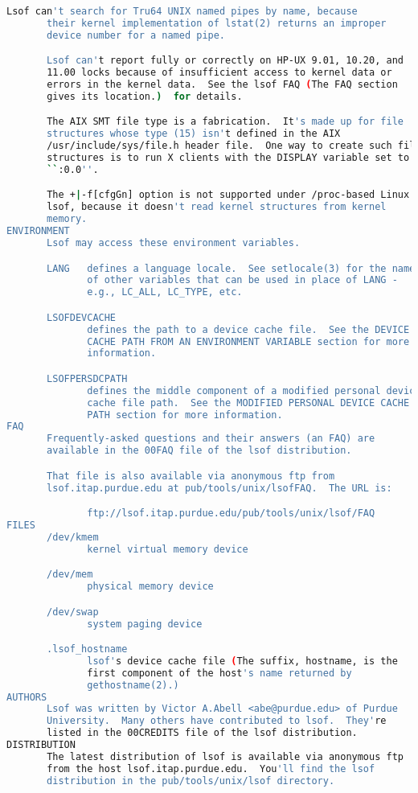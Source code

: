 {{\begin{lstlisting}[language=bash]
       Lsof can't search for Tru64 UNIX named pipes by name, because
       their kernel implementation of lstat(2) returns an improper
       device number for a named pipe.

       Lsof can't report fully or correctly on HP-UX 9.01, 10.20, and
       11.00 locks because of insufficient access to kernel data or
       errors in the kernel data.  See the lsof FAQ (The FAQ section
       gives its location.)  for details.

       The AIX SMT file type is a fabrication.  It's made up for file
       structures whose type (15) isn't defined in the AIX
       /usr/include/sys/file.h header file.  One way to create such file
       structures is to run X clients with the DISPLAY variable set to
       ``:0.0''.

       The +|-f[cfgGn] option is not supported under /proc-based Linux
       lsof, because it doesn't read kernel structures from kernel
       memory.
ENVIRONMENT
       Lsof may access these environment variables.

       LANG   defines a language locale.  See setlocale(3) for the names
              of other variables that can be used in place of LANG -
              e.g., LC_ALL, LC_TYPE, etc.

       LSOFDEVCACHE
              defines the path to a device cache file.  See the DEVICE
              CACHE PATH FROM AN ENVIRONMENT VARIABLE section for more
              information.

       LSOFPERSDCPATH
              defines the middle component of a modified personal device
              cache file path.  See the MODIFIED PERSONAL DEVICE CACHE
              PATH section for more information.
FAQ
       Frequently-asked questions and their answers (an FAQ) are
       available in the 00FAQ file of the lsof distribution.

       That file is also available via anonymous ftp from
       lsof.itap.purdue.edu at pub/tools/unix/lsofFAQ.  The URL is:

              ftp://lsof.itap.purdue.edu/pub/tools/unix/lsof/FAQ
FILES
       /dev/kmem
              kernel virtual memory device

       /dev/mem
              physical memory device

       /dev/swap
              system paging device

       .lsof_hostname
              lsof's device cache file (The suffix, hostname, is the
              first component of the host's name returned by
              gethostname(2).)
AUTHORS
       Lsof was written by Victor A.Abell <abe@purdue.edu> of Purdue
       University.  Many others have contributed to lsof.  They're
       listed in the 00CREDITS file of the lsof distribution.
DISTRIBUTION
       The latest distribution of lsof is available via anonymous ftp
       from the host lsof.itap.purdue.edu.  You'll find the lsof
       distribution in the pub/tools/unix/lsof directory.


\end{lstlisting}}}
